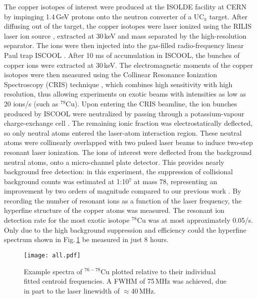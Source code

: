 \documentclass[reprint,superscriptaddress,amsmath,amssymb,aps,prl]{revtex4-1}
\begin{document}
The copper isotopes of interest were produced at the ISOLDE facility at CERN by impinging 1.4\,GeV protons onto the neutron converter \cite{Koster2002} of a UC$_\text{x}$ target. After diffusing out of the target, the copper isotopes were laser ionized using the RILIS laser ion source \cite{Weissman2002,Koster2011,Rothe2016}, extracted at 30\,keV and mass separated by the high-resolution separator. The ions were then injected into the gas-filled radio-frequency linear Paul trap ISCOOL \cite{Mane2009,Franberg2008}. After 10 ms of accumulation in ISCOOL, the bunches of copper ions were extracted at 30\,keV. The electromagnetic moments of the copper isotopes were then measured using the Collinear Resonance Ionization Spectroscopy (CRIS) technique \cite{Flanagan2013,deGroote2015}, which combines high sensitivity with high resolution, thus allowing experiments on exotic beams with intensities as low as 20 ions/s (such as $^{78}$Cu). Upon entering the CRIS beamline, the ion bunches produced by ISCOOL were neutralized
by passing through a potassium-vapour charge-exchange cell \cite{Procter2012}. The remaining ionic fraction was electrostatically deflected, so only neutral atoms entered the laser-atom interaction region. These neutral atoms were collinearly overlapped with two pulsed laser beams to induce two-step resonant laser ionization. The ions of interest were deflected from the background neutral atoms, onto a micro-channel plate detector. This provides nearly background free detection: in this experiment, the suppression of collisional background counts was estimated at 1:10$^7$ at mass 78, representing an improvement by two orders of magnitude compared to our previous work \cite{Flanagan2013}. By recording the number of resonant ions as a function of the laser frequency, the hyperfine structure of the copper atoms was measured. The resonant ion detection rate for the most exotic isotope $^{78}$Cu was at most approximately 0.05/s. Only due to the high background suppression and efficiency could the hyperfine spectrum shown in Fig.\,\ref{fig:spectra} be measured in just 8 hours.

\begin{figure}
    \texttt{[image: all.pdf]}
    \caption{Example spectra of $^{76-78}$Cu plotted relative to their individual fitted centroid frequencies. A FWHM of 75\,MHz was achieved, due in part to the laser linewidth of $\approx$40\,MHz.}\label{fig:spectra}
\end{figure}
\end{document}
